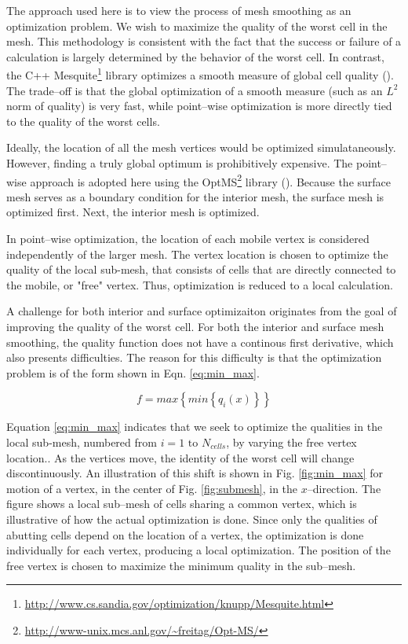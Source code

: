 \documentclass[a4paper,12pt,notitlepage]{article}
\begin{document}
The approach used here is to view the process of mesh smoothing as an
optimization problem.  We wish to maximize the quality of the worst
cell in the mesh.  This methodology is consistent with the fact that
the success or failure of a calculation is largely
determined by the behavior of the worst cell.  In contrast, the C++
Mesquite\footnote{\url{http://www.cs.sandia.gov/optimization/knupp/Mesquite.html}}
library optimizes a smooth measure of global cell quality
(\cite{mesquite:freitag,mesquite:brewer}).  The trade--off is that the
global optimization of a smooth measure (such as an $L^{2}$ norm of
quality) is very fast, while point--wise optimization is more directly
tied to the quality of the worst cells.

Ideally, the location of all the mesh vertices would be optimized
simulataneously.  However, finding a truly global optimum is prohibitively expensive.  
The point--wise approach is adopted here using the
OptMS\footnote{\url{http://www-unix.mcs.anl.gov/~freitag/Opt-MS/}}
library (\cite{optms:manual}).  Because the surface mesh serves as a
boundary condition for the interior mesh, the surface mesh is
optimized first.  Next, the interior mesh is optimized.

In point--wise optimization, the location of each mobile vertex is considered independently of the larger mesh.  The vertex location is chosen to optimize the quality of the local sub-mesh, that consists of cells that are directly connected to the mobile, or "free" vertex.  Thus, optimization is reduced to a local calculation.

A challenge for both interior and surface optimizaiton originates 
from the goal of improving the quality of the worst cell.  For
both the interior and surface mesh smoothing, the quality function
does not have a continous first derivative, which also presents
difficulties.  The reason for this difficulty is that the optimization
problem is of the form shown in Eqn. \ref{eq:min_max}.

\begin{equation}
  \label{eq:min_max}
  f=max \left\lbrace min \left\lbrace q_i \left(
        x\right)\right\rbrace \right\rbrace 
\end{equation} 

Equation \ref{eq:min_max} indicates that we seek to optimize the
qualities in the local sub-mesh, numbered from $i=1 \mbox{ to } N_{cells}$, by varying the
free vertex location..  As
the vertices move, the identity of the worst cell will change
discontinuously.  An illustration of this shift is shown in
Fig. \ref{fig:min_max} for motion of a vertex, in the center of
Fig. \ref{fig:submesh}, in the $x$--direction.  The figure shows a
local sub--mesh of cells sharing a common vertex, which is illustrative
of how the actual optimization is done.  Since only the qualities of
abutting cells depend on the location of a vertex, the optimization is
done individually for each vertex, producing a local optimization.
The position of the
free vertex is chosen to maximize the minimum quality in the
sub--mesh.
\end{document}
